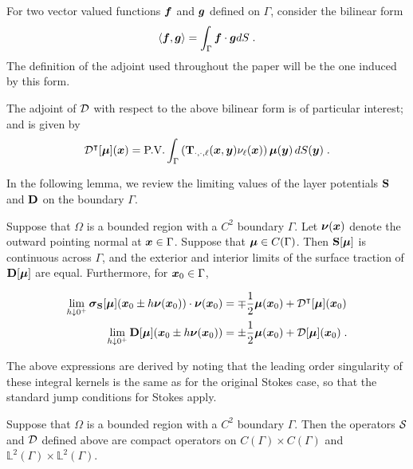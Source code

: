 For two vector valued
functions ${\boldsymbol f}$ and ${\boldsymbol g}$ defined on $\Gamma$, consider the bilinear
form
\begin{equation} \label{eq:bi_form}
  \langle {\boldsymbol f} , {\boldsymbol g} \rangle = \int_\Gamma {\boldsymbol f} \cdot {\boldsymbol g} dS \; .
\end{equation}
The definition of the adjoint used throughout the paper will be
the one induced by this form.


The adjoint of ${\mathcal D}$ with respect to the above bilinear form
is of particular interest; and is given by
\begin{equation}
  {\mathcal D}^{\intercal} [{\boldsymbol \mu}]({\boldsymbol x}) = 
  \textrm{P.V.} \int_\Gamma \left ( {\bf T}_{\cdot,\cdot,\ell}({\boldsymbol x},{\boldsymbol y})\nu_\ell({\boldsymbol x})
  \right ) {\boldsymbol \mu}({\boldsymbol y}) \, dS({\boldsymbol y}) \; .
\end{equation}


In the following lemma, we review the limiting values of
the layer potentials ${\bf S}$ and ${\bf D}$ on the boundary $\Gamma$.

\begin{lemma} \label{lem:jump-conds}
  Suppose that $\Omega$ is a bounded region with a $C^{2}$ boundary
  $\Gamma$.
  Let ${\boldsymbol \nu}({\boldsymbol x})$ denote the outward pointing normal at ${\boldsymbol x} \in \Gamma$.
  Suppose that ${\boldsymbol \mu} \in C(\Gamma)$.
  Then ${\bf S}[{\boldsymbol \mu}]$
  is continuous across $\Gamma$, and the exterior and interior
  limits of the surface traction of ${\bf D}[{\boldsymbol \mu}]$ are equal.
  Furthermore, for ${\boldsymbol x}_{0} \in \Gamma$,

  \begin{align}
    \lim_{h \downarrow 0^{+}} {\boldsymbol \sigma}_{\bf S}[{\boldsymbol \mu}]({\boldsymbol x}_0 \pm h{\boldsymbol \nu}({\boldsymbol x}_0)) \cdot {\boldsymbol \nu}({\boldsymbol x}_0)
    &= \mp \frac{1}{2} {\boldsymbol \mu}({\boldsymbol x}_0) + {\mathcal D}^{\intercal}[{\boldsymbol \mu}]({\boldsymbol x}_0) \\
    \lim_{h \downarrow 0^{+}} {\bf D}[{\boldsymbol \mu}]({\boldsymbol x}_0 \pm h{\boldsymbol \nu}({\boldsymbol x}_0)) 
    &= \pm \frac{1}{2} {\boldsymbol \mu}({\boldsymbol x}_0) + {\mathcal D}[{\boldsymbol \mu}]({\boldsymbol x}_0)    \; .
  \end{align}
\end{lemma}

The above expressions are derived by noting that the
leading order singularity of these integral kernels
is the same as for the original Stokes case, so that
the standard jump conditions for Stokes
\cite{KimSangtae1991,Pozrikidis1992}
apply. 

\begin{lemma} \label{lem:compact-sd}
  Suppose that $\Omega$ is a bounded region with a $C^{2}$ boundary
  $\Gamma$. Then the operators ${\mathcal S}$ and ${\mathcal D}$ defined
  above are compact operators on $C(\Gamma)\times C(\Gamma)$
  and $\mathbb{L}^2(\Gamma)\times \mathbb{L}^2(\Gamma)$.
\end{lemma}

